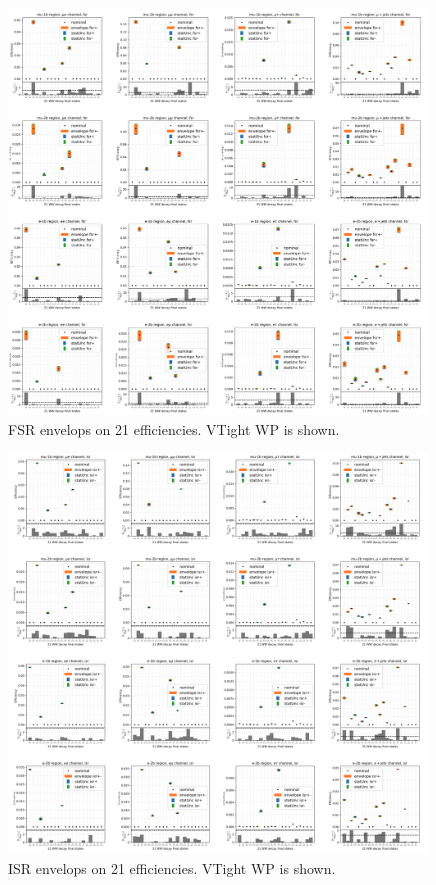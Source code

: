\begin{figure}
    \centering
    \includegraphics[width=0.99\textwidth]{chapters/Analysis/sectionSystematics/figures/ttTheoretical/fsr.png}    
    \caption{FSR envelops on 21 efficiencies. VTight WP is shown.}
    \label{fig:appendix:reweighttt:effAfterCorrFSR}
\end{figure}



\begin{figure}
    \centering
    \includegraphics[width=0.99\textwidth]{chapters/Analysis/sectionSystematics/figures/ttTheoretical/isr.png}
    \caption{ISR envelops on 21 efficiencies. VTight WP is shown.}
    \label{fig:appendix:reweighttt:effAfterCorrISR}
\end{figure}


